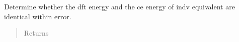\documentclass[letterpaper,10pt,english]{sphinxmanual}
\begin{document}
\begin{fulllineitems}
\begin{fulllineitems}
\begin{quote}
\begin{description}
\begin{description}
\end{description}

\end{description}\end{quote}

\end{fulllineitems}


\begin{fulllineitems}
\label{\detokenize{pygace:pygace.utility.EleIndv.is_correct}}
Determine whether the dft energy and the ce energy of indv equivalent
are identical within error.
\begin{quote}\begin{description}
\item[{Returns}] \leavevmode\begin{description}
\item[{}] \leavevmode
\end{description}

\end{description}\end{quote}

\end{fulllineitems}


\begin{fulllineitems}
\label{\detokenize{pygace:pygace.utility.EleIndv.set_app}}~
\end{fulllineitems}


\end{fulllineitems}

\end{document}
